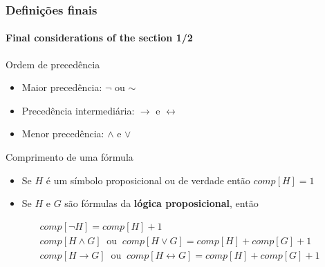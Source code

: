 \documentclass[10pt]{beamer}
\begin{document}
%
\begin{frame}[t]
    \frametitle{Definições finais}
    \framesubtitle{Final considerations of the section 1/2}
    \small
    \begin{block}{Ordem de precedência}
        \begin{itemize}
            \item Maior precedência: $\lnot$ ou $\sim$ 
            \item Precedência intermediária: $\rightarrow$ e $\leftrightarrow$
            \item Menor precedência: $\land$ e $\lor$
        \end{itemize}        
    \end{block}
    \pause
    \begin{block}{Comprimento de uma fórmula}
        \begin{itemize}
            \item Se $H$ é um símbolo proposicional ou de verdade então $comp[H]=1$
            \item Se $H$ e $G$ são fórmulas da \textbf{lógica proposicional}, então
        \end{itemize}
        \begin{gather*}
            comp[\lnot H] = comp[H] + 1 \\
            comp[H \land G]~\text{ ou }~comp[H \lor G] = comp[H] + comp[G] + 1 \\
            comp[H \rightarrow G]~\text{ ou }~comp[H \leftrightarrow G] = comp[H] + comp[G] + 1
        \end{gather*}
    \end{block}
\end{frame}
%
\end{document}
